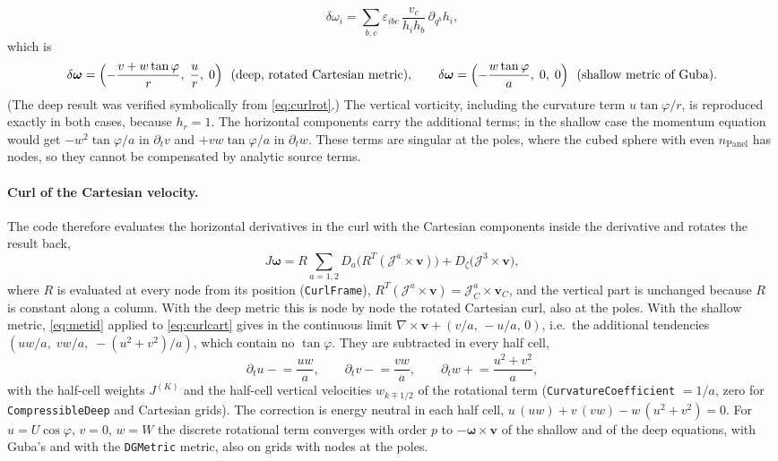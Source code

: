 \documentclass[11pt,a4paper]{article}
\newcommand{\vv}{\bm{v}}
\newcommand{\Jm}{\mathcal{J}}
\newcommand{\code}[1]{\texttt{#1}}
\begin{document}
\begin{itemize}
\begin{equation}
    \delta\omega_i = \sum_{b,c}\varepsilon_{ibc}\,
      \frac{v_c}{h_i h_b}\,\partial_{q^b}h_i ,
    \label{eq:dom}
  \end{equation}
  which is
  \begin{equation}
    \delta\bm\omega = \Bigl(-\frac{v + w\tan\varphi}{r},\;\frac{u}{r},\;0\Bigr)
    \ \ \text{(deep, rotated Cartesian metric)},\qquad
    \delta\bm\omega = \Bigl(-\frac{w\tan\varphi}{a},\;0,\;0\Bigr)
    \ \ \text{(shallow metric of Guba)}.
  \end{equation}
  (The deep result was verified symbolically from \eqref{eq:curlrot}.)
  The vertical vorticity, including the curvature term $u\tan\varphi/r$, is
  reproduced exactly in both cases, because $h_r = 1$. The horizontal
  components carry the additional terms; in the shallow case the momentum
  equation would get $-w^2\tan\varphi/a$ in $\partial_t v$ and
  $+vw\tan\varphi/a$ in $\partial_t w$. These terms are singular at the
  poles, where the cubed sphere with even $n_{\text{Panel}}$ has nodes, so
  they cannot be compensated by analytic source terms.
\end{itemize}

\paragraph{Curl of the Cartesian velocity.}
The code therefore evaluates the horizontal derivatives in the curl with the
Cartesian components inside the derivative and rotates the result back,
\begin{equation}
  J\bm\omega = R\sum_{a=1,2} D_a\bigl(R^T(\Jm^a\times\vv)\bigr)
     + D_\zeta\bigl(\Jm^3\times\vv\bigr),
  \label{eq:curlcart}
\end{equation}
where $R$ is evaluated at every node from its position (\code{CurlFrame}),
$R^T(\Jm^a\times\vv) = \Jm^a_C\times\vv_C$, and the vertical part is
unchanged because $R$ is constant along a column. With the deep metric this
is node by node the rotated Cartesian curl, also at the poles. With the
shallow metric, \eqref{eq:metid} applied to \eqref{eq:curlcart} gives in the
continuous limit $\nabla\times\vv + (v/a,\,-u/a,\,0)$, i.e.\ the additional
tendencies $(uw/a,\; vw/a,\; -(u^2+v^2)/a)$, which contain no
$\tan\varphi$. They are subtracted in every half cell,
\begin{equation}
  \partial_t u \mathrel{-}= \frac{u w}{a},\qquad
  \partial_t v \mathrel{-}= \frac{v w}{a},\qquad
  \partial_t w \mathrel{+}= \frac{u^2 + v^2}{a},
\end{equation}
with the half-cell weights $J^{(K)}$ and the half-cell vertical velocities
$w_{k\mp1/2}$ of the rotational term (\code{CurvatureCoefficient} $=1/a$, zero
for \code{CompressibleDeep} and Cartesian grids). The correction is energy
neutral in each half cell, $u\,(uw) + v\,(vw) - w\,(u^2+v^2) = 0$. For
$u = U\cos\varphi$, $v = 0$, $w = W$ the discrete rotational term converges
with order $p$ to $-\bm\omega\times\vv$ of the shallow and of the deep
equations, with Guba's and with the \code{DGMetric} metric, also on grids
with nodes at the poles.
\end{document}

